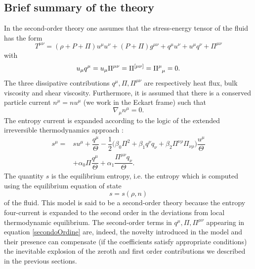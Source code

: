 \documentclass[a4paper, amsfonts, amssymb, amsmath, reprint, showkeys, nofootinbib, twoside]{revtex4-1}
\begin{document}
\subsection{Brief summary of the theory}\label{BIs}

In the second-order theory one assumes that the stress-energy tensor of the fluid has the form
\begin{equation}
T^{\mu \nu} = (\rho + P+\Pi)u^\mu u^\nu + (P+\Pi)g^{\mu \nu} +q^\mu u^\nu +u^\mu q^\nu + \Pi^{\mu \nu}
\end{equation}
with
\begin{equation}
u_\mu q^\mu  =u_\mu \Pi^{\mu \nu}= \Pi^{[\mu \nu]}= \Pi\indices{^\mu _\mu}=0.
\end{equation}
The three dissipative contributions $q^\mu,\Pi,\Pi^{\mu \nu}$ are respectively heat flux, bulk viscosity and shear viscosity. Furthermore, it is assumed that there is a conserved particle current $n^\mu = n u^\mu$ (we work in the Eckart frame) such that
\begin{equation}\label{conservo}
\nabla_\mu n^\mu =0.
\end{equation}
The entropy current is expanded according to the logic of the extended irreversible thermodynamics approach \citep{Jou_Extended}:
\begin{equation}\label{secondoOrdine}
\begin{split}
 s^\mu = & su^\mu + \dfrac{q^\mu}{\Theta} -\dfrac{1}{2} \big(\beta_0 \Pi^2 +\beta_1 q^\nu q_\nu + \beta_2 \Pi^{\nu \rho} \Pi_{\nu \rho} \big) \dfrac{u^\mu}{\Theta}\\
& + \alpha_0 \Pi \dfrac{q^\mu}{\Theta} + \alpha_1 \dfrac{\Pi^{\mu \nu}q_\nu}{\Theta}.
\end{split}
\end{equation}
The quantity $s$ is the equilibrium entropy, i.e. the entropy which is computed using the equilibrium equation of state
\begin{equation}
s =s(\rho,n)
\end{equation}
of the fluid. This model is said to be a second-order theory because the entropy four-current is expanded to the second order in the deviations from local thermodynamic equilibrium. The second-order terms in $q^\mu,\Pi,\Pi^{\mu \nu}$ appearing in equation \eqref{secondoOrdine} are, indeed, the novelty introduced in the model and their presence can compensate (if the coefficients satisfy appropriate conditions) the inevitable explosion of the zeroth and first order contributions we described in the previous sections.
\end{document}
